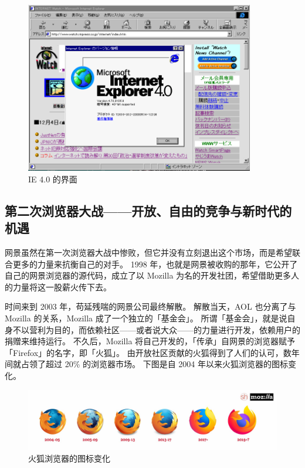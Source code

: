 \begin{figure}[htb!]
  \centering
  \includegraphics[width=10cm]{assets/IE_4.png}
  \caption{IE 4.0 的界面}
  \label{IE_4}
\end{figure}

\subsection[第二次浏览器大战——开放、自由的竞争与新时代的机遇]{第二次浏览器大战{\normalsize ——开放、自由的竞争与新时代的机遇}}

网景虽然在第一次浏览器大战中惨败，但它并没有立刻退出这个市场，而是希望联合更多的力量来抗衡自己的对手。
1998 年，也就是网景被收购的那年，它公开了自己的网景浏览器的源代码，成立了以 Mozilla 为名的开发社团，希望借助更多人的力量将这一股薪火传下去。

时间来到 2003 年，苟延残喘的网景公司最终解散。
解散当天，AOL 也分离了与 Mozilla 的关系，Mozilla 成了一个独立的「基金会」。
所谓「基金会」，就是说自身不以营利为目的，而依赖社区——或者说大众——的力量进行开发，依赖用户的捐赠来维持运行。
不久后，Mozilla 将自己开发的，「传承」自网景的浏览器赋予「Firefox」的名字，即「火狐」。
由开放社区贡献的火狐得到了人们的认可，数年间就占领了超过 20\% 的浏览器市场。
下图是自 2004 年以来火狐浏览器的图标变化。

\begin{figure}[htb!]
  \centering
  \includegraphics[width=12cm]{assets/Firefox_Logo_History.jpg}
  \caption{火狐浏览器的图标变化}
  \label{Firefox_Logo_History}
\end{figure}

